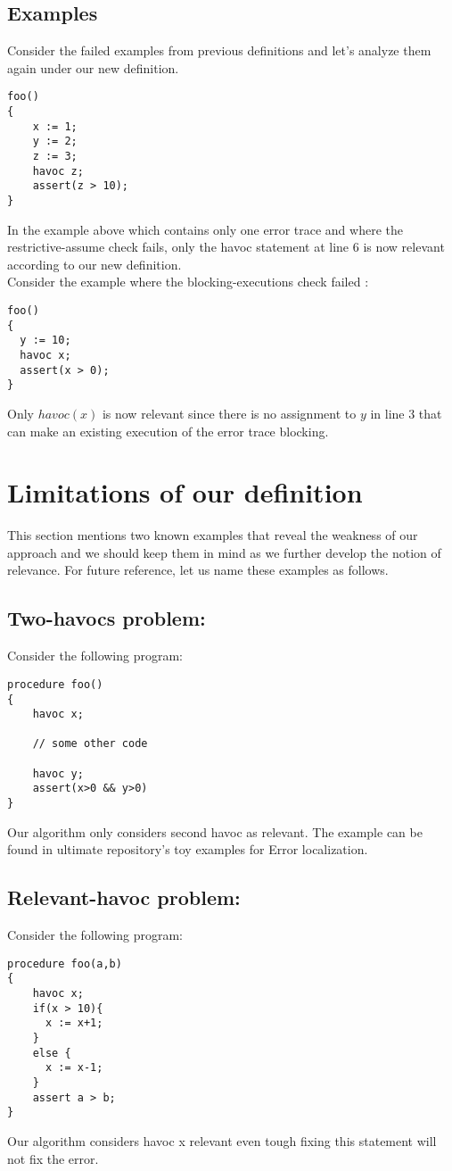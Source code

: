\documentclass{article}
\begin{document}
\subsection{Examples}
Consider the failed examples from previous definitions and let's analyze them again under our new definition.
\begin{lstlisting}
foo()
{
	x := 1;
	y := 2;
	z := 3;
	havoc z;
	assert(z > 10);
}
\end{lstlisting}
In the example above which contains only one error trace and where the restrictive-assume check fails, only the havoc statement at line 6 is now relevant according to our new definition. \\
Consider the example where the blocking-executions check failed :
\begin{lstlisting}
foo()
{
  y := 10;
  havoc x;
  assert(x > 0);
}
\end{lstlisting}
Only $havoc(x)$ is now relevant since there is no assignment to $y$ in line 3 that can make an existing execution of the error trace blocking.


\section{Limitations of our definition}
This section mentions two known examples that reveal the weakness of our approach and we should keep them in mind as we further develop the notion of relevance. For future reference, let us name these examples as follows.
\subsection{Two-havocs problem:}
Consider the following program:
\begin{lstlisting}
procedure foo()
{
	havoc x;
	
	// some other code	
	
	havoc y;
	assert(x>0 && y>0)
}
\end{lstlisting}
Our algorithm only considers second havoc as relevant. The example can be found in ultimate repository's toy examples for Error localization.

\subsection{Relevant-havoc problem:}
Consider the following program:
\begin{lstlisting}
procedure foo(a,b)
{
    havoc x;
    if(x > 10){
      x := x+1;
    }
    else {
      x := x-1;
    }
    assert a > b;
}
\end{lstlisting}
Our algorithm considers havoc x relevant even tough fixing this statement will not fix the error.
\end{document}
